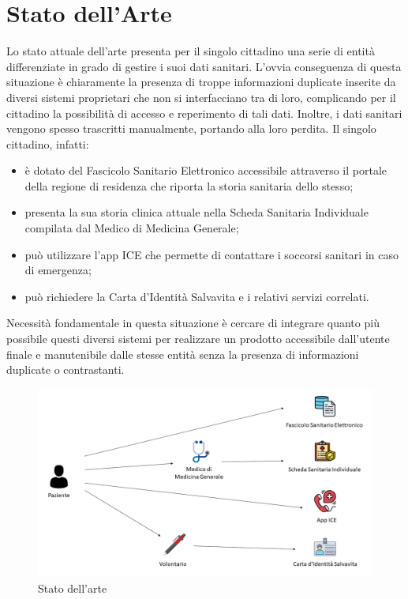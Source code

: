 \documentclass[12pt,a4paper,twoside,openright,titlepage]{book}
\begin{document}
\section{Stato dell'Arte}
Lo stato attuale dell'arte presenta per il singolo cittadino una serie di entità differenziate in grado di gestire i suoi dati sanitari. L'ovvia conseguenza di questa situazione è chiaramente la presenza di troppe informazioni duplicate inserite da diversi sistemi proprietari che non si interfacciano tra di loro, complicando per il cittadino la possibilità di accesso e reperimento di tali dati. Inoltre, i dati sanitari vengono spesso trascritti manualmente, portando alla loro perdita.
Il singolo cittadino, infatti:
\begin{itemize}
\item è dotato del Fascicolo Sanitario Elettronico accessibile attraverso il portale della regione di residenza che riporta la storia sanitaria dello stesso;
\item presenta la sua storia clinica attuale nella Scheda Sanitaria Individuale compilata dal Medico di Medicina Generale;
\item può utilizzare l'app ICE che permette di contattare i soccorsi sanitari in caso di emergenza;
\item può richiedere la Carta d'Identità Salvavita e i relativi servizi correlati.
\end{itemize}
Necessità fondamentale in questa situazione è cercare di integrare quanto più possibile questi diversi sistemi per realizzare un prodotto accessibile dall'utente finale e manutenibile dalle stesse entità senza la presenza di informazioni duplicate o contrastanti.

\begin{figure}[H]
\centering
\includegraphics[scale = 0.4]{statoarte}
\caption{Stato dell'arte}
\end{figure}
\end{document}
